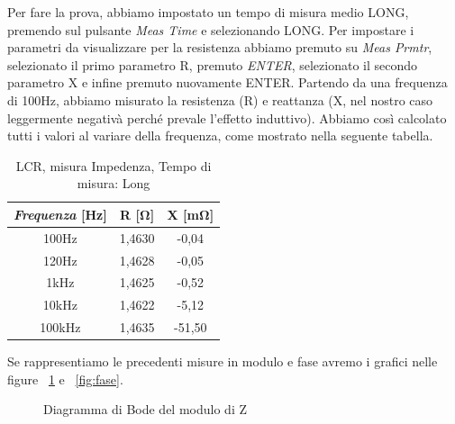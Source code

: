 Per fare la prova, abbiamo impostato un tempo di misura medio LONG, premendo sul pulsante \emph{Meas Time} e selezionando LONG.
Per impostare i parametri da visualizzare per la resistenza abbiamo premuto su \emph{Meas Prmtr}, selezionato il primo parametro R, premuto \emph{ENTER}, selezionato il secondo parametro X e infine premuto nuovamente ENTER.
Partendo da una frequenza di 100Hz, abbiamo misurato la resistenza (R) e reattanza (X, nel nostro caso leggermente negativà perché prevale l'effetto induttivo). Abbiamo così calcolato tutti i valori al variare della frequenza, come mostrato nella seguente tabella.  


\begin{table}[!ht]
\centering
\begin{tabular}{|c|c|c|}
\hline
\textit{\textbf{Frequenza}} \textbf{[Hz]} & \textbf{R [$\bm{\Omega}$]}  & \textbf{X [m$\bm{\Omega}$]}  \\ \hline
100Hz                       & 1,4630    & -0,04      \\ \hline
120Hz                       & 1,4628    & -0,05      \\ \hline
1kHz                        & 1,4625    & -0,52      \\ \hline
10kHz                       & 1,4622    & -5,12      \\ \hline
100kHz                      & 1,4635    & -51,50     \\ \hline
\end{tabular}
\caption{LCR, misura Impedenza, Tempo di misura: Long}
\label{tab:lcr_z}
\end{table}
\FloatBarrier


Se rappresentiamo le precedenti misure in modulo e fase avremo i grafici nelle figure ~\ref{fig:modulo} e ~\ref{fig:fase}.
%

\begin{figure}[h]
    \centering
    \caption{Diagramma di Bode del modulo di Z}
    \label{fig:modulo}
\end{figure}
\FloatBarrier
\clearpage

